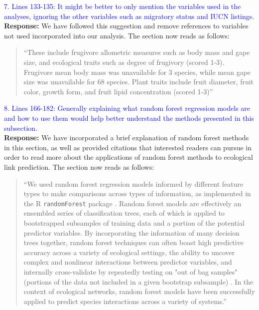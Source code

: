 \documentclass{article}
\begin{document}
\textcolor{blue}{7. Lines 133-135: It might be better to only mention the variables used in the analyses, ignoring the other variables such as migratory status and IUCN listings.} \\
\textbf{Response:} We have followed this suggestion and remove references to variables not used incorporated into our analysis. The section now reads as follows: 
\begin{quote}
	“These include frugivore allometric measures such as body mass and gape size, and ecological traits such as degree of frugivory (scored 1-3). Frugivore mean body mass was unavailable for 3 species, while mean gape size was unavailable for 68 species. Plant traits include fruit diameter, fruit color, growth form, and fruit lipid concentration (scored 1-3)”
\end{quote}

\textcolor{blue}{8. Lines 166-182: Generally explaining what random forest regression models are and how to use them would help better understand the methods presented in this subsection.} \\

\textbf{Response:} We have incorporated a brief explanation of random forest methods in this section, as well as provided citations that interested readers can pursue in order to read more about the applications of random forest methods to ecological link prediction. The section now reads as follows: 
    \begin{quote}
        	“We used random forest regression models informed by different feature types to make comparisons across types of information, as implemented in the R \texttt{randomForest} package \cite{randomForest}. Random forest models are effectively an ensembled series of classification trees, each of which is applied to bootstrapped subsamples of training data and a portion of the potential predictor variables. By incorporating the information of many decision trees together, random forest techniques can often boast high predictive accuracy across a variety of ecological settings, the ability to uncover complex and nonlinear interactions between predictor variables, and internally cross-validate by repeatedly testing on "out of bag samples" (portions of the data not included in a given bootstrap subsample) \cite{breiman2001random,cutler2007random}. In the context of ecological networks, random forest models have been successfully applied to predict species interactions across a variety of systems.\citep{desjardins2017ecological, pichler2020, sydenham2022metacomnet}” 
    \end{quote}
\end{document}
